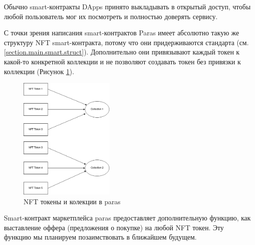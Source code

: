 \begin{remark}
    Обычно smart-контракты DApps принято выкладывать в открытый доступ, чтобы любой пользователь мог их посмотреть и полностью доверять сервису.
\end{remark}

С точки зрения написания smart-контрактов Paras имеет абсолютно такую же структуру NFT smart-контракта, потому что они придерживаются стандарта \cite{nftstandart} (см. {\color{blue} \ref{section.main.smart.struct}}).
Дополнительно они привязывают каждый токен к какой-то конкретной коллекции и не позволяют создавать токен без привязки к коллекции (Рисунок {\color{blue} \ref{fig.parascollections}}).

\begin{figure}
	\centering
	\includegraphics[height=60mm]{fig/parascollections.png}
	\caption{NFT токены и колекции в paras}
    \label{fig.parascollections}
\end{figure}

Smart-контракт маркетплейса paras предоставляет дополнительную функцию, как выставление оффера (предложения о покупке) на любой NFT токен. Эту функцию мы планируем позаимствовать в ближайшем будущем.


